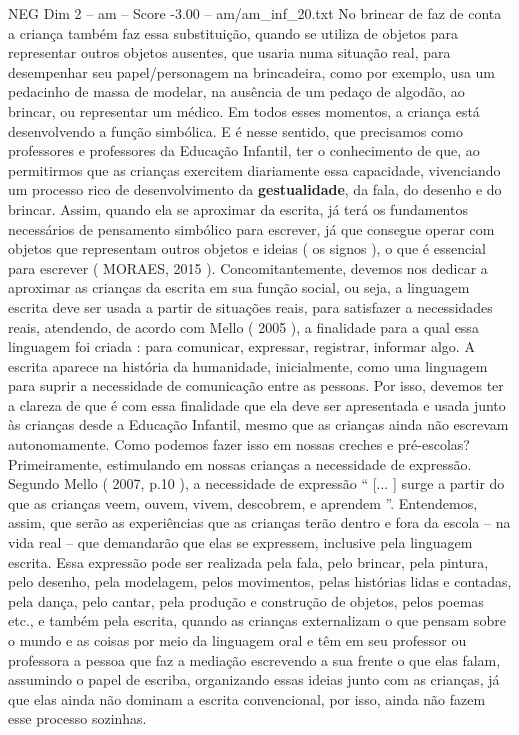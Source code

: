 \begin{textsample}{NEG Dim 2 – am – Score -3.00 – am/am\_inf\_20.txt}
No brincar de faz de conta a criança também faz essa substituição, quando se utiliza de objetos para representar outros objetos ausentes, que usaria numa situação real, para desempenhar seu papel/personagem na brincadeira, como por exemplo, usa um pedacinho de massa de modelar, na ausência de um pedaço de algodão, ao brincar, ou representar um médico.
Em todos esses momentos, a criança está desenvolvendo a função simbólica.
E é nesse sentido, que precisamos como professores e professores da Educação Infantil, ter o conhecimento de que, ao permitirmos que as crianças exercitem diariamente essa capacidade, vivenciando um processo rico de desenvolvimento da \textbf{gestualidade}, da fala, do desenho e do brincar.
Assim, quando ela se aproximar da escrita, já terá os fundamentos necessários de pensamento simbólico para escrever, já que consegue operar com objetos que representam outros objetos e ideias ( os signos ), o que é essencial para escrever ( MORAES, 2015 ).
Concomitantemente, devemos nos dedicar a aproximar as crianças da escrita em sua função social, ou seja, a linguagem escrita deve ser usada a partir de situações reais, para satisfazer a necessidades reais, atendendo, de acordo com Mello ( 2005 ), a finalidade para a qual essa linguagem foi criada : para comunicar, expressar, registrar, informar algo.
A escrita aparece na história da humanidade, inicialmente, como uma linguagem para suprir a necessidade de comunicação entre as pessoas.
Por isso, devemos ter a clareza de que é com essa finalidade que ela deve ser apresentada e usada junto às crianças desde a Educação Infantil, mesmo que as crianças ainda não escrevam autonomamente.
Como podemos fazer isso em nossas creches e pré-escolas?
Primeiramente, estimulando em nossas crianças a necessidade de expressão.
Segundo Mello ( 2007, p.10 ), a necessidade de expressão “ [... ] surge a partir do que as crianças veem, ouvem, vivem, descobrem, e aprendem ”.
Entendemos, assim, que serão as experiências que as crianças terão dentro e fora da escola – na vida real – que demandarão que elas se expressem, inclusive pela linguagem escrita.
Essa expressão pode ser realizada pela fala, pelo brincar, pela pintura, pelo desenho, pela modelagem, pelos movimentos, pelas histórias lidas e contadas, pela dança, pelo cantar, pela produção e construção de objetos, pelos poemas etc., e também pela escrita, quando as crianças externalizam o que pensam sobre o mundo e as coisas por meio da linguagem oral e têm em seu professor ou professora a pessoa que faz a mediação escrevendo a sua frente o que elas falam, assumindo o papel de escriba, organizando essas ideias junto com as crianças, já que elas ainda não dominam a escrita convencional, por isso, ainda não fazem esse processo sozinhas.

\end{textsample}
